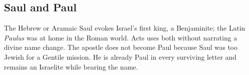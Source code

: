 \subsection{Saul and Paul}

The Hebrew or Aramaic Saul evokes Israel's first king, a Benjaminite; the
Latin \emph{Paulus} was at home in the Roman world. Acts uses both without
narrating a divine name change. The apostle does not become Paul because Saul
was too Jewish for a Gentile mission. He is already Paul in every surviving
letter and remains an Israelite while bearing the name.

